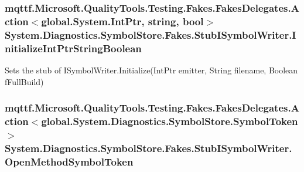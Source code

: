 \hypertarget{class_system_1_1_diagnostics_1_1_symbol_store_1_1_fakes_1_1_stub_i_symbol_writer_a73ffd22a76d444a661c395fc4de94e6c}{
\subsubsection[{Initialize\-Int\-Ptr\-String\-Boolean}]{\setlength{\rightskip}{0pt plus 5cm}mqttf.\-Microsoft.\-Quality\-Tools.\-Testing.\-Fakes.\-Fakes\-Delegates.\-Action$<$global.\-System.\-Int\-Ptr, string, bool$>$ System.\-Diagnostics.\-Symbol\-Store.\-Fakes.\-Stub\-I\-Symbol\-Writer.\-Initialize\-Int\-Ptr\-String\-Boolean}}\label{class_system_1_1_diagnostics_1_1_symbol_store_1_1_fakes_1_1_stub_i_symbol_writer_a73ffd22a76d444a661c395fc4de94e6c}


Sets the stub of I\-Symbol\-Writer.\-Initialize(\-Int\-Ptr emitter, String filename, Boolean f\-Full\-Build)

\hypertarget{class_system_1_1_diagnostics_1_1_symbol_store_1_1_fakes_1_1_stub_i_symbol_writer_adf3fe7f5d6f4a47f3da00c414ce2c9b7}{
\subsubsection[{Open\-Method\-Symbol\-Token}]{\setlength{\rightskip}{0pt plus 5cm}mqttf.\-Microsoft.\-Quality\-Tools.\-Testing.\-Fakes.\-Fakes\-Delegates.\-Action$<$global.\-System.\-Diagnostics.\-Symbol\-Store.\-Symbol\-Token$>$ System.\-Diagnostics.\-Symbol\-Store.\-Fakes.\-Stub\-I\-Symbol\-Writer.\-Open\-Method\-Symbol\-Token}}\label{class_system_1_1_diagnostics_1_1_symbol_store_1_1_fakes_1_1_stub_i_symbol_writer_adf3fe7f5d6f4a47f3da00c414ce2c9b7}


